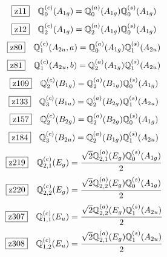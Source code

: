 \documentclass[fleqn,10pt,landscape]{jsarticle}
\begin{document}
\begin{dmath*}
\hspace*{3mm}\fbox{z11}\quad \mathbb{Q}_{0}^{(c)}(A_{1g})=\mathbb{Q}_{0}^{(a)}(A_{1g}) \mathbb{Q}_{0}^{(s)}(A_{1g})
\end{dmath*}
\begin{dmath*}
\hspace*{3mm}\fbox{z12}\quad \mathbb{Q}_{2}^{(c)}(A_{1g})=\mathbb{Q}_{2}^{(a)}(A_{1g}) \mathbb{Q}_{0}^{(s)}(A_{1g})
\end{dmath*}
\begin{dmath*}
\hspace*{3mm}\fbox{z80}\quad \mathbb{Q}_{1}^{(c)}(A_{2u},a)=\mathbb{Q}_{0}^{(a)}(A_{1g}) \mathbb{Q}_{1}^{(s)}(A_{2u})
\end{dmath*}
\begin{dmath*}
\hspace*{3mm}\fbox{z81}\quad \mathbb{Q}_{1}^{(c)}(A_{2u},b)=\mathbb{Q}_{2}^{(a)}(A_{1g}) \mathbb{Q}_{1}^{(s)}(A_{2u})
\end{dmath*}
\begin{dmath*}
\hspace*{3mm}\fbox{z109}\quad \mathbb{Q}_{2}^{(c)}(B_{1g})=\mathbb{Q}_{2}^{(a)}(B_{1g}) \mathbb{Q}_{0}^{(s)}(A_{1g})
\end{dmath*}
\begin{dmath*}
\hspace*{3mm}\fbox{z133}\quad \mathbb{Q}_{3}^{(c)}(B_{1u})=\mathbb{Q}_{2}^{(a)}(B_{2g}) \mathbb{Q}_{1}^{(s)}(A_{2u})
\end{dmath*}
\begin{dmath*}
\hspace*{3mm}\fbox{z157}\quad \mathbb{Q}_{2}^{(c)}(B_{2g})=\mathbb{Q}_{2}^{(a)}(B_{2g}) \mathbb{Q}_{0}^{(s)}(A_{1g})
\end{dmath*}
\begin{dmath*}
\hspace*{3mm}\fbox{z184}\quad \mathbb{Q}_{3}^{(c)}(B_{2u})=\mathbb{Q}_{2}^{(a)}(B_{1g}) \mathbb{Q}_{1}^{(s)}(A_{2u})
\end{dmath*}
\begin{dmath*}
\hspace*{3mm}\fbox{z219}\quad \mathbb{Q}_{2,1}^{(c)}(E_{g})=\frac{\sqrt{2} \mathbb{Q}_{2,1}^{(a)}(E_{g}) \mathbb{Q}_{0}^{(s)}(A_{1g})}{2}
\end{dmath*}
\begin{dmath*}
\hspace*{3mm}\fbox{z220}\quad \mathbb{Q}_{2,2}^{(c)}(E_{g})=\frac{\sqrt{2} \mathbb{Q}_{2,2}^{(a)}(E_{g}) \mathbb{Q}_{0}^{(s)}(A_{1g})}{2}
\end{dmath*}
\begin{dmath*}
\hspace*{3mm}\fbox{z307}\quad \mathbb{Q}_{1,1}^{(c)}(E_{u})=\frac{\sqrt{2} \mathbb{Q}_{2,2}^{(a)}(E_{g}) \mathbb{Q}_{1}^{(s)}(A_{2u})}{2}
\end{dmath*}
\begin{dmath*}
\hspace*{3mm}\fbox{z308}\quad \mathbb{Q}_{1,2}^{(c)}(E_{u})=\frac{\sqrt{2} \mathbb{Q}_{2,1}^{(a)}(E_{g}) \mathbb{Q}_{1}^{(s)}(A_{2u})}{2}
\end{dmath*}
\vspace{5mm}
\end{document}
